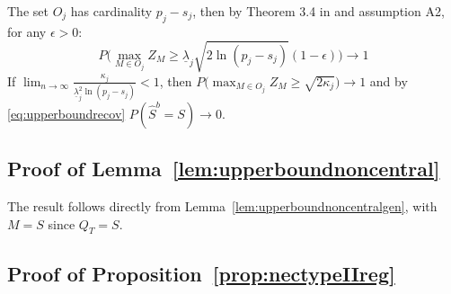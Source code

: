 \documentclass[aos]{imsart}
\theoremstyle{plain}
\begin{document}
\begin{supplement}
The set $O_j$ has cardinality $p_j-s_j$, then by Theorem 3.4 in \cite{hartigan} and assumption A2, for any $\epsilon>0$:
$$P\big(\max_{M\in O_j}Z_M \geq \underline{\lambda}_j \sqrt{2 \ln(p_j-s_j)}(1-\epsilon)\big) \to 1$$
If $\lim_{n\to\infty}\frac{\kappa_j}{\underline{\lambda}_j^2\ln(p_j-s_j)} <1$, then $P\big(\max_{M\in O_j}Z_M\geq\sqrt{2\kappa_j}\big) \to 1$ and by \eqref{eq:upperboundrecov} $P(\hat{S}^b=S) \to 0$.

\subsection{Proof of Lemma~\ref{lem:upperboundnoncentral}}
The result follows directly from Lemma~\ref{lem:upperboundnoncentralgen}, with $M=S$ since $Q_T=S$.

\subsection{Proof of Proposition~\ref{prop:nectypeIIreg}}


\end{supplement}
\end{document}
